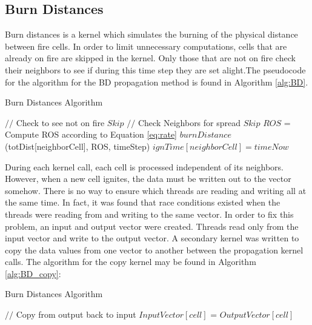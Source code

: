 \subsection{Burn Distances}
Burn distances is a kernel which simulates the burning of the physical distance between fire cells. In order to limit unnecessary computations, cells that are already on fire are skipped in the kernel. Only those that are not on fire check their neighbors to see if during this time step they are set alight.The pseudocode for the algorithm for the BD propagation method is found in Algorithm \ref{alg:BD}.

\begin{algorithm}[H]
  \caption{Burn Distances Algorithm}
  \label{alg:BD}
  \begin{algorithmic}
  \STATE $//$ Check to see not on fire
  \STATE $Skip$
  \ENDIF
  \STATE $//$ Check Neighbors for spread
  \STATE $Skip$
  \ENDIF
  \STATE $ROS$ = Compute ROS according to Equation \ref{eq:rate}
  \STATE $burnDistance$(totDist[neighborCell], ROS, timeStep)
  \STATE $ignTime[neighborCell] = timeNow$
  \ENDIF
  \ENDFOR
  \ENDFOR
  \end{algorithmic}
\end{algorithm}

During each kernel call, each cell is processed independent of its neighbors. However, when a new cell ignites, the data must be written out to the vector somehow. There is no way to ensure which threads are reading and writing all at the same time. In fact, it was found that race conditions existed when the threads were reading from and writing to the same vector. In order to fix this problem, an input and output vector were created. Threads read only from the input vector and write to the output vector. A secondary kernel was written to copy the data values from one vector to another between the propagation kernel calls. The algorithm for the copy kernel may be found in Algorithm \ref{alg:BD_copy}:

\begin{algorithm}[H]
  \caption{Burn Distances Algorithm}
  \label{alg:BD_copy}
  \begin{algorithmic}
  \STATE $//$ Copy from output back to input 
  \STATE $InputVector[cell]$ = $OutputVector[cell]$
  \ENDFOR
  \end{algorithmic}
\end{algorithm}

